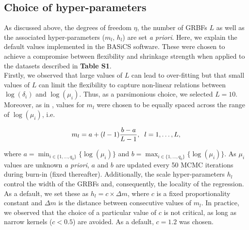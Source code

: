 \subsection{Choice of hyper-parameters} \label{sec2:hyper-parameters}

As discussed above, the degrees of freedom $\eta$, the number of GRBFs  $L$ as well as the associated hyper-parameters ($m_l$, $h_l$) are set \emph{a priori}. Here, we explain the default values implemented in the BASiCS software. These were chosen to achieve a compromise between flexibility and shrinkage strength when applied to the datasets described in \textbf{Table S1}. \\ 

Firstly, we observed that large values of $L$ can lead to over-fitting but that small values of $L$ can limit the flexibility to capture non-linear relations between $\log(\delta_i)$ and $\log(\mu_i)$. Thus, as a parsimonious choice, we selected $L = 10$. Moreover, as in \cite{Kapourani2016}, values for $m_l$ were chosen to be equally spaced across the range of $\log(\mu_i)$, i.e. 

\begin{equation} m_l = a + (l-1)\frac{b - a }{L-1}, \hspace{0.2cm}  l=1,\ldots, L, \end{equation} 

where $a=\min_{i\in\{1,\ldots,q_0\}}\{\log(\mu_i)\}$ and $b=\max_{i\in\{1,\ldots,q_0\}}\{\log(\mu_i)\}$. As $\mu_i$ values are unknown \emph{a priori}, $a$ and $b$ are updated every 50 MCMC iterations during burn-in (fixed thereafter). Additionally, the scale hyper-parameters $h_l$ control the width of the GRBFs and, consequently, the locality of the regression. As a default, we set these as $h_l = c \times \Delta m$, where $c$ is a fixed proportionality constant and $\Delta m$ is the distance between consecutive values of $m_l$. In practice, we observed that the choice of a particular value of $c$ is not critical, as long as narrow kernels ($c<0.5$) are avoided. As a default, $c = 1.2$ was chosen. \\

